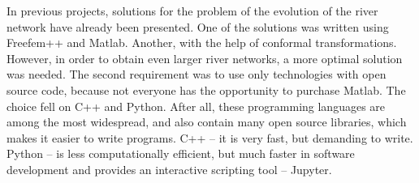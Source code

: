 \documentclass[]{pracamgr}
\begin{document}
    In previous projects, solutions for the problem of the evolution of the river network have already been presented. One of the solutions was written using Freefem++ and Matlab. Another, with the help of conformal transformations. However, in order to obtain even larger river networks, a more optimal solution was needed. The second requirement was to use only technologies with open source code, because not everyone has the opportunity to purchase Matlab. The choice fell on C++\cite{Stroustrup1997} and Python. After all, these programming languages are among the most widespread, and also contain many open source libraries, which makes it easier to write programs. C++ -- it is very fast, but demanding to write. Python\cite{python3} -- is less computationally efficient, but much faster in software development and provides an interactive scripting tool -- Jupyter.
\end{document}
